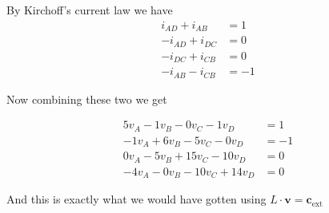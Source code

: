 By Kirchoff's current law we have 
\begin{align*}
 i_{AD} + i_{AB} &= 1 \\
 -i_{AD} + i_{DC} &= 0 \\
 -i_{DC} + i_{CB} &= 0 \\
 -i_{AB} - i_{CB} &= -1
\end{align*}

Now combining these two we get 

\begin{align*}
 5v_A  - 1 v_B - 0 v_C - 1 v_D &= 1 \\
 -1v_A + 6 v_B - 5 v_C - 0 v_D &= -1 \\
 0v_A - 5v_B + 15 v_C - 10 v_D &= 0 \\
 -4v_A - 0v_B - 10v_C + 14v_D &= 0
\end{align*}

And this is exactly what we would have gotten using $L \cdot \textbf{v} = \textbf{c}_{\text{ext}}$






